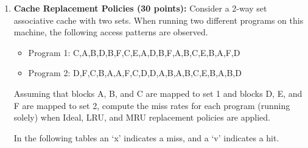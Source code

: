 \documentclass[a4paper, 11pt]{exam}
\begin{document}
\begin{enumerate}
\begin{enumerate} [label=(\alph*)]
 \begin{itemize}
 	\item First the processor can address $8\cdot2^{30}$ bytes of memory, so the address is 33 bits.
	\item For L1 we find:
	\begin{itemize}
	\item The blocks are 16=$2^4$ bytes, so the offset is 4 bits.
	\item The cache has $\frac{2^5\cdot2^{10} bytes}{2^4 bytes} = 2^{11}$ entries, so the index is 11 bits.
	\item Finally, we have $33-4-11=19$ bits for the tag.
	\end{itemize}
	\item For L2 we find:
	\begin{itemize}
	\item Each cache line is $64=2^6$ bytes, so the offset is 6 bits.
	\item From the 4 sets, and the 64B cache line we find $\frac{2^{20}bytes}{4\cdot64bytes}=\frac{2^{20}}{2^8}=2^{12}$ index locations, so the index is 12 bits.
	\item Finally the tag is $33-6-12=15$ bits.
	\end{itemize}
 \end{itemize}
 \item  Compute the size of the data and tag arrays in KB for each level. 
 \end{enumerate}

\item \textbf {Cache Replacement Policies (30 points): }  Consider a 2-way set associative cache with two
sets. When running two different programs on this machine, the following access patterns are
observed. 

\begin{itemize}
\item Program 1: C,A,B,D,B,F,C,E,A,D,B,F,A,B,C,E,B,A,F,D
\item Program 2: D,F,C,B,A,A,F,C,D,D,A,B,A,B,C,E,B,A,B,D
\end{itemize}
Assuming that blocks A, B, and C are mapped to set 1 and blocks D, E, and F are mapped to
set 2, compute the miss rates for each program (running solely) when Ideal, LRU, and MRU
replacement policies are applied.

In the following tables an `x' indicates a miss, and a `v' indicates a hit.


\end{enumerate}
\end{document}
